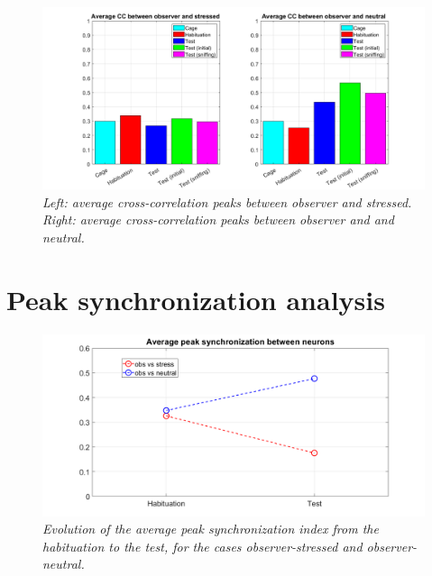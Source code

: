 \documentclass[12pt, a4paper]{report}
\begin{document}
\begin{figure}[H]
	
	\begin{center}
		\hspace*{-1.4cm}
		\includegraphics[scale=.5]{cc_average.png} 
	\end{center} 
	\caption{\textit{Left: average cross-correlation peaks between observer and stressed. Right: average cross-correlation peaks between observer and and neutral.}}
	\label{cc_average}
\end{figure}



\section{Peak synchronization analysis}

\begin{figure}[H]
	
	\begin{center}
		\hspace*{-1.4cm}
		\includegraphics[scale=.5]{avg_pks.png} 
	\end{center} 
	\caption{\textit{Evolution of the average peak synchronization index from the habituation to the test, for the cases observer-stressed and observer-neutral.}} \label{avg_pks}
	
\end{figure}
\end{document}
